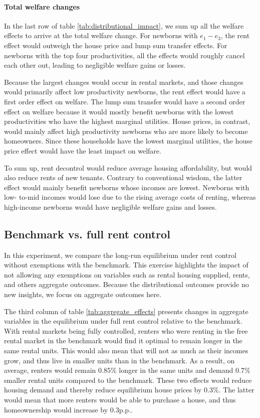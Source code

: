 \documentclass[parskip=full]{article}
\begin{document}
\paragraph{Total welfare changes} In the last row of table \ref{tab:distributional_impact}, we sum up all the welfare effects to arrive at the total welfare change. For newborns with $e_{1}-e_{3}$, the rent effect would outweigh the house price and lump sum transfer effects. For newborns with the top four productivities, all the effects would roughly cancel each other out, leading to negligible welfare gains or losses. 

Because the largest changes would occur in rental markets, and those changes would primarily affect low productivity newborns, the rent effect would have a first order effect on welfare. The lump sum transfer would have a second order effect on welfare because it would mostly benefit newborns with the lowest productivities who have the highest marginal utilities. House prices, in contrast, would mainly affect high productivity newborns who are more likely to become homeowners. Since these households have the lowest marginal utilities, the house price effect would have the least impact on welfare. 

To sum up, rent decontrol would reduce average housing affordability, but would also reduce rents of new tenants. Contrary to conventional wisdom, the latter effect would mainly benefit newborns whose incomes are lowest. Newborns with low- to-mid incomes would lose due to the rising average costs of renting, whereas high-income newborns would have negligible welfare gains and losses.

\subsection{Benchmark vs. full rent control}

In this experiment, we compare the long-run equilibrium under rent control without exemptions with the benchmark. This exercise highlights the impact of not allowing any exemptions on variables such as rental housing supplied, rents, and others aggregate outcomes. Because the distributional outcomes provide no new insights, we focus on aggregate outcomes here.  

The third column of table \ref{tab:aggregate_effects} presents changes in aggregate variables in the equilibrium under full rent control relative to the benchmark. With rental markets being fully controlled, renters who were renting in the free rental market in the benchmark would find it optimal to remain longer in the same rental units. This would also mean that will not as much as their incomes grow, and thus live in smaller units than in the benchmark. As a result, on average, renters would remain 0.85\% longer in the same units and demand 0.7\% smaller rental units compared to the benchmark. These two effects would reduce housing demand and thereby reduce equilibrium house prices by 0.3\%. The latter would mean that more renters would be able to purchase a house, and thus homeownership would increase by 0.3p.p.. 
\end{document}
